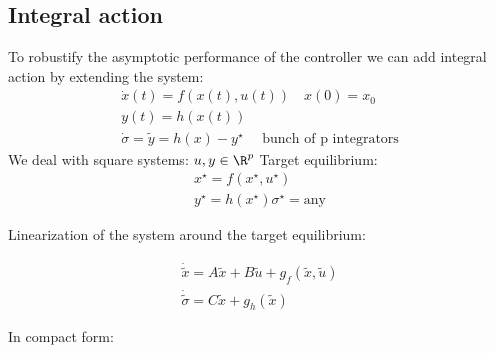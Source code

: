 \documentclass[english]{lectures}
\begin{document}
\subsection{Integral action}
To robustify the asymptotic performance of the controller we can add integral action by extending the system:\\
\begin{gather*}
    \dot{x}(t)=f(x(t),u(t)) \quad x(0)=x_0\\
    y(t)=h(x(t))\\
    \dot{\sigma}=\tilde{y}=h(x)-y^\star \quad \text{ bunch of p integrators}
\end{gather*}
We deal with square systems: $u,y \in \R^p$
Target equilibrium:
\begin{gather*}
    x^\star=f(x^\star,u^\star)\\
    y^\star=h(x^\star)
    \sigma^\star=\text{any}
\end{gather*}

Linearization of the system around the target equilibrium:

\begin{gather*}
    \dot{\tilde{x}}=A\tilde{x}+B\tilde{u} +g_f(\tilde{x},\tilde{u})\\
    \dot{\tilde{\sigma}}=C\tilde{x}+g_h(\tilde{x})
\end{gather*}

In compact form:
\end{document}
